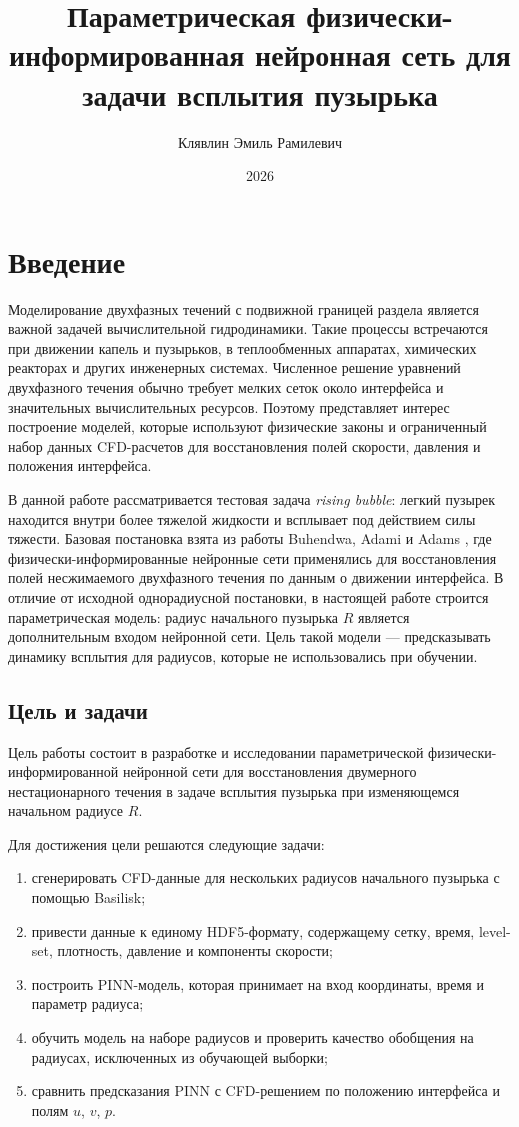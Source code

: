 \documentclass[12pt,a4paper]{article}
\title{Параметрическая физически-информированная нейронная сеть для задачи всплытия пузырька}
\author{Клявлин Эмиль Рамилевич}
\date{2026}
\begin{document}
\maketitle

\section{Введение}

Моделирование двухфазных течений с подвижной границей раздела является важной
задачей вычислительной гидродинамики. Такие процессы встречаются при движении
капель и пузырьков, в теплообменных аппаратах, химических реакторах и других
инженерных системах. Численное решение уравнений двухфазного течения обычно
требует мелких сеток около интерфейса и значительных вычислительных ресурсов.
Поэтому представляет интерес построение моделей, которые используют физические
законы и ограниченный набор данных CFD-расчетов для восстановления полей
скорости, давления и положения интерфейса.

В данной работе рассматривается тестовая задача \textit{rising bubble}: легкий
пузырек находится внутри более тяжелой жидкости и всплывает под действием силы
тяжести. Базовая постановка взята из работы Buhendwa, Adami и Adams
\cite{Buhendwa2021}, где физически-информированные нейронные сети применялись
для восстановления полей несжимаемого двухфазного течения по данным о движении
интерфейса. В отличие от исходной однорадиусной постановки, в настоящей работе
строится параметрическая модель: радиус начального пузырька \(R\) является
дополнительным входом нейронной сети. Цель такой модели --- предсказывать
динамику всплытия для радиусов, которые не использовались при обучении.

\subsection{Цель и задачи}

Цель работы состоит в разработке и исследовании параметрической
физически-информированной нейронной сети для восстановления двумерного
нестационарного течения в задаче всплытия пузырька при изменяющемся начальном
радиусе \(R\).

Для достижения цели решаются следующие задачи:
\begin{enumerate}
    \item сгенерировать CFD-данные для нескольких радиусов начального пузырька
    с помощью Basilisk;
    \item привести данные к единому HDF5-формату, содержащему сетку, время,
    level-set, плотность, давление и компоненты скорости;
    \item построить PINN-модель, которая принимает на вход координаты, время и
    параметр радиуса;
    \item обучить модель на наборе радиусов и проверить качество обобщения на
    радиусах, исключенных из обучающей выборки;
    \item сравнить предсказания PINN с CFD-решением по положению интерфейса и
    полям \(u\), \(v\), \(p\).
\end{enumerate}
\end{document}

